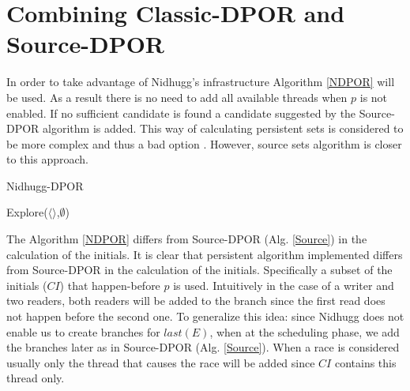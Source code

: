 \section{Combining Classic-DPOR and Source-DPOR}

In order to take advantage of Nidhugg's infrastructure Algorithm \ref{NDPOR} will be used. As a result there is no need to add all
available threads when $p$ is not enabled. If no sufficient candidate is found
a candidate suggested by the Source-DPOR algorithm is added. This way of calculating persistent sets is considered to be more 
complex and thus a bad option \cite{Gode05}. However, source sets algorithm is closer to this approach.

\begin{algorithm}
    \caption{Nidhugg-DPOR}
    \label{NDPOR}
    Explore($\langle \rangle$,$\emptyset$)\;
\end{algorithm}

The Algorithm \ref{NDPOR} differs from Source-DPOR (Alg. \ref{Source}) in the calculation of the initials.
It is clear that persistent algorithm implemented differs from Source-DPOR in the calculation of the initials. 
Specifically a subset of the initials ($CI$) that happen-before $p$ is used. 
Intuitively in the case of a writer and two readers, both readers will be added to the branch since the first read does not
happen before the second one.
To generalize this idea: since Nidhugg does not enable us to create branches for $last(E)$, when at the scheduling phase, we add the 
branches later as in Source-DPOR (Alg. \ref{Source}). When a race is considered usually only the thread that causes the race will be added since 
$CI$ contains this thread only.

